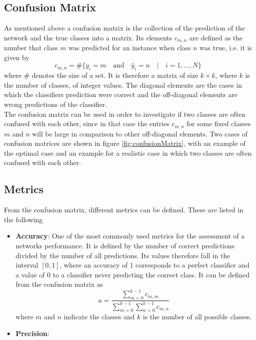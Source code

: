 \subsection{Confusion Matrix}

As mentioned above a confusion matrix is the collection of the prediction of the network and the true classes into a matrix. Its elements $c_{m,n}$ are defined as the number that class $m$ was predicted for an instance when class $n$ was true, i.e. it is given by
\begin{equation}
c_{m,n} = \# \{y_i = m \quad \textrm{and} \quad \hat{y}_i = n \quad | \quad i=1,\dots,N  \}
\end{equation}
where $\#$ denotes the size of a set. It is therefore a matrix of size $k\times k$, where $k$ is the number of classes, of integer values. The diagonal elements are the cases in which the classifiers prediction were correct and the off-diagonal elements are wrong predictions of the classifier. \\

The confusion matrix can be used in order to investigate if two classes are often confused with each other, since in that case the entries $c_{m,n}$ for some fixed classes $m$ and $n$ will be large in comparison to other off-diagonal elements. Two cases of confusion matrices are shown in figure \ref{fig:confusionMatrix}, with an example of the optimal case and an example for a realistic case in which two classes are often confused with each other. \\

\subsection{Metrics}

From the confusion matrix, different metrics can be defined. These are listed in the following
\begin{itemize}[label={}]
\item \textbf{Accuracy}: One of the most commonly used metrics for the assessment of a networks performance. It is defined by the number of correct predictions divided by the number of all predictions. Its values therefore fall in the interval $[0,1]$, where an accuracy of $1$ corresponds to a perfect classifier and a value of $0$ to a classifier never predicting the correct class. It can be defined from the confusion matrix as 
\begin{equation}
a = \frac{\sum_{m=0}^{k-1} c_{m,m}}{\sum_{m=0}^{k-1} \sum_{n=0}^{k-1} c_{m,n}}
\end{equation} 
where $m$ and $n$ indicate the classes and $k$ is the number of all possible classes.
\item \textbf{Precision}:
\end{itemize}



